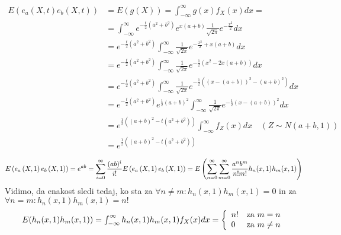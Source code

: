 \documentclass[ letterpaper, titlepage, fleqn]{article}
\begin{document}
{\setlength{\mathindent}{0cm}
\begin{equation*}
\begin{aligned}
E\left(e_a\left(X, t\right)e_b\left(X, t\right)\right) &= E\left(g\left(X\right)\right) = \int_{-\infty}^{\infty}g\left(x\right)f_X\left(x\right)dx = \\[8px]
&= \int_{-\infty}^{\infty} e^{-\frac{t}{2}(a^2 + b^2)} e^{x \left(a + b\right)} \frac{1}{\sqrt{2\pi}} e^{-\frac{x^2}{2}} dx \\[8px]
&= e^{-\frac{t}{2}\left(a^2 + b^2\right)} \int_{-\infty}^{\infty} \frac{1}{\sqrt{2\pi}} e^{-\frac{x^2}{2} + x \left(a + b\right)} dx \\[8px]
& = e^{-\frac{t}{2} \left(a^2 + b^2\right)} \int_{-\infty}^{\infty} \frac{1}{\sqrt{2\pi}} e^{-\frac{1}{2} \left(x^2 - 2x \left(a + b\right)\right)} dx \\[8px]
&= e^{-\frac{t}{2} \left(a^2 + b^2\right)} \int_{-\infty}^{\infty} \frac{1}{\sqrt{2\pi}} e^{-\frac{1}{2} \left(\left(x - \left(a + b\right)\right)^2 -\left (a + b\right)^2\right)} dx \\[8px]
& = e^{-\frac{t}{2} \left(a^2 + b^2\right)} e^{\frac{1}{2} \left(a + b\right)^2} \int_{-\infty}^{\infty} \frac{1}{\sqrt{2\pi}} e^{-\frac{1}{2} \left(x - \left(a + b\right)\right)^2} dx \\[8px]
& = e^{\frac{1}{2} \left(\left(a + b\right)^2 - t \left(a^2 + b^2\right)\right)} \int_{-\infty}^{\infty} f_Z(x) dx \quad (Z \sim N(a + b, 1)) \\[8px]
& = e^{\frac{1}{2} \left(\left(a + b\right)^2 - t \left(a^2 + b^2\right)\right)}
\end{aligned}
\end{equation*}

\begin{equation*}
E\left(e_a\left(X, 1\right) e_b\left(X, 1\right)\right) = e^{ab} = \sum_{i=0}^{\infty} \frac{(ab)^i}{i!} \\[8px]
E\left(e_a\left(X, 1\right) e_b\left(X, 1\right)\right) = E\left(\sum_{n=0}^{\infty} \sum_{m=0}^{\infty} \frac{a^n b^m}{n! m!} h_n(x, 1) h_m(x, 1)\right) \\[8px]
\end{equation*}
Vidimo, da enakost sledi tedaj, ko sta za $ \forall n \neq m : h_n(x, 1) h_m(x, 1) = 0 $ in za $ \forall n = m : h_n(x, 1) h_m(x, 1) = n! $ \\[10px]
\[
$$
E(h_n(x, 1) h_m(x, 1)) = \int_{-\infty}^{\infty} h_n(x, 1) h_m(x, 1) f_X(x) dx  =
\left\{
\begin{array}{lr}
 n! & \text{za } m = n \\
 0 & \text{za } m \neq n 
 \end{array} 
 \right.
$$
\]
\pagebreak


}
\end{document}
